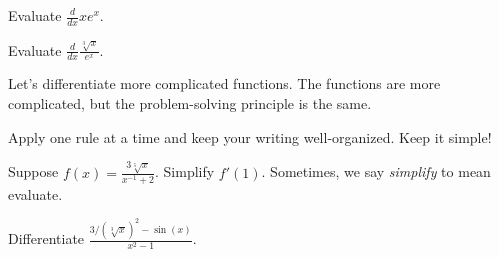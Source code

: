 \documentclass[../main.tex]{subfiles}
\begin{document}
\begin{example}
  Evaluate \(\frac{d}{dx} x e^{x}\).

\end{example}

\begin{example}
  Evaluate \(\frac{d}{dx} \frac{\sqrt[3]{x}}{e^{x}}\).

\end{example}
\clearpage

Let's differentiate more complicated functions. The functions are more complicated, but the problem-solving principle is the same. 
\begin{mdframed}[style=simple]
  \color{main}
  \centering
  Apply one rule at a time and keep your writing well-organized. Keep it simple! 
\end{mdframed}

\begin{example}
  Suppose \(f(x) = \frac{3 \sqrt[5]{x}}{x^{-1} + 2}\). Simplify \(f'(1)\). 
  \hfill{}
  {\scriptsize Sometimes, we say \emph{simplify} to mean evaluate.}

\end{example}


\begin{example}
  Differentiate \(\frac{3/(\sqrt[3]{x})^{2} - \sin(x)}{x^{2} - 1}\).

\end{example}
\clearpage
\end{document}
